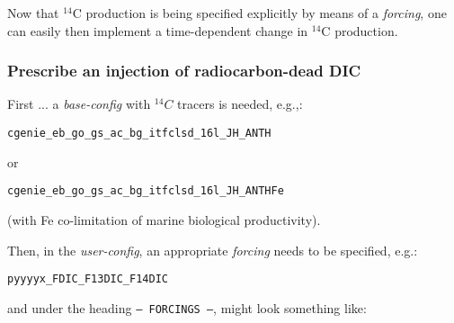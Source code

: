 \documentclass[11pt,fleqn]{book} %
\begin{document}
Now that \(^{14}\)C production is being specified explicitly by means of a \textit{forcing}, one can easily then implement a time-dependent change in \(^{14}\)C production.

%
\newpage
\subsubsection{Prescribe an injection of radiocarbon-dead DIC}
\vspace{1mm}

First ... a \textit{base-config} with \(^{14}C\) tracers is needed, e.g.,:
\vspace{-2mm}\small\begin{verbatim}
cgenie_eb_go_gs_ac_bg_itfclsd_16l_JH_ANTH
\end{verbatim}\normalsize\vspace{-2mm}
or
\vspace{-2mm}\small\begin{verbatim}
cgenie_eb_go_gs_ac_bg_itfclsd_16l_JH_ANTHFe
\end{verbatim}\normalsize\vspace{-2mm}
(with Fe co-limitation of marine biological productivity).

Then, in the \textit{user-config}, an appropriate \textit{forcing} needs to be specified, e.g.:
\vspace{-2mm}\small\begin{verbatim}
pyyyyx_FDIC_F13DIC_F14DIC
\end{verbatim}\normalsize\vspace{-2mm}
and under the heading \texttt{--- FORCINGS ---}, might look something like:
 
\end{document}
